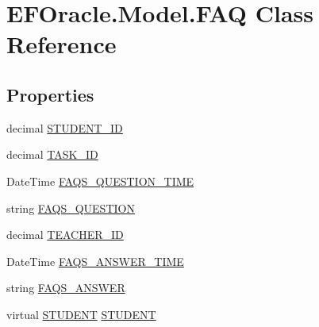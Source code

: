 \hypertarget{class_e_f_oracle_1_1_model_1_1_f_a_q}{}\section{E\+F\+Oracle.\+Model.\+F\+AQ Class Reference}
\label{class_e_f_oracle_1_1_model_1_1_f_a_q}
\subsection*{Properties}
\begin{DoxyCompactItemize}
\item 
decimal \hyperlink{class_e_f_oracle_1_1_model_1_1_f_a_q_a0bcf83da72276f02028f8acfaed304a7}{S\+T\+U\+D\+E\+N\+T\+\_\+\+ID}
\item 
decimal \hyperlink{class_e_f_oracle_1_1_model_1_1_f_a_q_ac119f0ed74ccfd75000b6c3457b3b010}{T\+A\+S\+K\+\_\+\+ID}
\item 
Date\+Time \hyperlink{class_e_f_oracle_1_1_model_1_1_f_a_q_acb0842a60775afbd015e10a437f3e236}{F\+A\+Q\+S\+\_\+\+Q\+U\+E\+S\+T\+I\+O\+N\+\_\+\+T\+I\+ME}
\item 
string \hyperlink{class_e_f_oracle_1_1_model_1_1_f_a_q_a65d95d519d8fc525edc85497a0749e42}{F\+A\+Q\+S\+\_\+\+Q\+U\+E\+S\+T\+I\+ON}
\item 
decimal \hyperlink{class_e_f_oracle_1_1_model_1_1_f_a_q_a3eac2b0318527689b32ef3d14ada8c8e}{T\+E\+A\+C\+H\+E\+R\+\_\+\+ID}
\item 
Date\+Time \hyperlink{class_e_f_oracle_1_1_model_1_1_f_a_q_a3a5dbd4785eab45b01e3cae25ee9de44}{F\+A\+Q\+S\+\_\+\+A\+N\+S\+W\+E\+R\+\_\+\+T\+I\+ME}
\item 
string \hyperlink{class_e_f_oracle_1_1_model_1_1_f_a_q_a1d272a26042ec0b0d0b75fa2d4a1efb6}{F\+A\+Q\+S\+\_\+\+A\+N\+S\+W\+ER}
\item 
virtual \hyperlink{class_e_f_oracle_1_1_model_1_1_s_t_u_d_e_n_t}{S\+T\+U\+D\+E\+NT} \hyperlink{class_e_f_oracle_1_1_model_1_1_f_a_q_aedf902539902e76ef64411fd4dac62b2}{S\+T\+U\+D\+E\+NT}

\end{DoxyCompactItemize}
